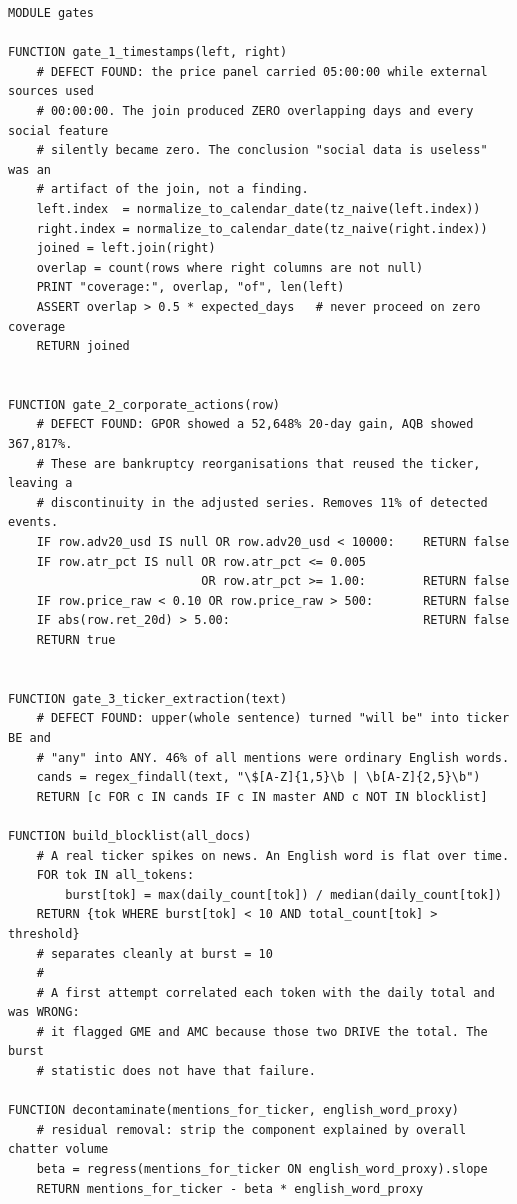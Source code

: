 \documentclass[10pt]{article}
\begin{document}
\begin{lstlisting}
MODULE gates

FUNCTION gate_1_timestamps(left, right)
    # DEFECT FOUND: the price panel carried 05:00:00 while external sources used
    # 00:00:00. The join produced ZERO overlapping days and every social feature
    # silently became zero. The conclusion "social data is useless" was an
    # artifact of the join, not a finding.
    left.index  = normalize_to_calendar_date(tz_naive(left.index))
    right.index = normalize_to_calendar_date(tz_naive(right.index))
    joined = left.join(right)
    overlap = count(rows where right columns are not null)
    PRINT "coverage:", overlap, "of", len(left)
    ASSERT overlap > 0.5 * expected_days   # never proceed on zero coverage
    RETURN joined


FUNCTION gate_2_corporate_actions(row)
    # DEFECT FOUND: GPOR showed a 52,648% 20-day gain, AQB showed 367,817%.
    # These are bankruptcy reorganisations that reused the ticker, leaving a
    # discontinuity in the adjusted series. Removes 11% of detected events.
    IF row.adv20_usd IS null OR row.adv20_usd < 10000:    RETURN false
    IF row.atr_pct IS null OR row.atr_pct <= 0.005
                           OR row.atr_pct >= 1.00:        RETURN false
    IF row.price_raw < 0.10 OR row.price_raw > 500:       RETURN false
    IF abs(row.ret_20d) > 5.00:                           RETURN false
    RETURN true


FUNCTION gate_3_ticker_extraction(text)
    # DEFECT FOUND: upper(whole sentence) turned "will be" into ticker BE and
    # "any" into ANY. 46% of all mentions were ordinary English words.
    cands = regex_findall(text, "\$[A-Z]{1,5}\b | \b[A-Z]{2,5}\b")
    RETURN [c FOR c IN cands IF c IN master AND c NOT IN blocklist]

FUNCTION build_blocklist(all_docs)
    # A real ticker spikes on news. An English word is flat over time.
    FOR tok IN all_tokens:
        burst[tok] = max(daily_count[tok]) / median(daily_count[tok])
    RETURN {tok WHERE burst[tok] < 10 AND total_count[tok] > threshold}
    # separates cleanly at burst = 10
    #
    # A first attempt correlated each token with the daily total and was WRONG:
    # it flagged GME and AMC because those two DRIVE the total. The burst
    # statistic does not have that failure.

FUNCTION decontaminate(mentions_for_ticker, english_word_proxy)
    # residual removal: strip the component explained by overall chatter volume
    beta = regress(mentions_for_ticker ON english_word_proxy).slope
    RETURN mentions_for_ticker - beta * english_word_proxy



\end{lstlisting}
\end{document}
